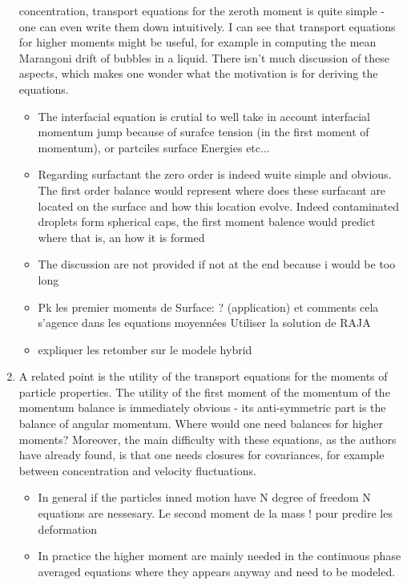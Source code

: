 \documentclass[10pt,a4paper]{article}
\newcommand{\tb}[1]{\color{blue}#1\color{black}}
\begin{document}
\begin{enumerate}
    concentration, transport equations for the zeroth moment is quite simple - one can even write
    them down intuitively. I can see that transport equations for higher moments might be useful,
    for example in computing the mean Marangoni drift of bubbles in a liquid. There isn't much
    discussion of these aspects, which makes one wonder what the motivation is for deriving the
    equations.
    \tb{
        \begin{itemize}
            \item The interfacial equation is crutial to well take in account interfacial momentum jump because of surafce tension (in the first moment of momentum), or partciles surface Energies etc... 
            \item Regarding surfactant the zero order is indeed wuite simple and obvious. The first order balance would represent where does these surfacant are located on the surface and how this location evolve. Indeed contaminated droplets form spherical caps, the first moment balence would predict where that is, an how it is formed
            \item The discussion are not provided if not at the end because i would be too long 
        \end{itemize}
        \begin{itemize}
            \item Pk les premier moments de Surface: ? (application) et comments cela s'agence dans les equations moyennées 
            Utiliser la solution de RAJA
            \item expliquer les retomber sur le modele hybrid 
        \end{itemize}
    }
    \item A related point is the utility of the transport equations for the moments of particle
    properties. The utility of the first moment of the momentum of the momentum balance is
    immediately obvious - its anti-symmetric part is the balance of angular momentum. Where
    would one need balances for higher moments? Moreover, the main difficulty with these
    equations, as the authors have already found, is that one needs closures for covariances, for
    example between concentration and velocity fluctuations.\tb{
    \begin{itemize}
        \item In general if the particles inned motion have N degree of freedom N equations are nessesary. Le second moment de la mass !  pour predire les deformation 
        \item In practice the higher moment are mainly needed in the continuous phase averaged equations where they appears anyway and need to be modeled.

\end{itemize}}
\end{enumerate}
\end{document}
